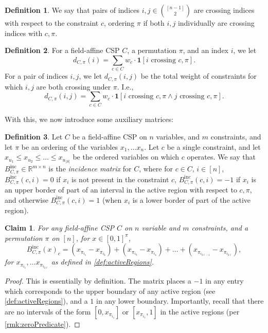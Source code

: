 \documentclass[11pt]{article}
\newtheorem{claim}[theorem]{Claim}
\theoremstyle{definition}
\newtheorem{definition}{Definition}[section]
\newcommand{\R}{\mathbb{R}}
\begin{document}
\begin{definition}
    We say that pairs of indices $i,j \in \binom{[n-1]}{2}$ are crossing indices with respect to the constraint $c$, ordering $\pi$ if both $i, j$ individually are crossing indices with $c, \pi$.
\end{definition}

\begin{definition}\label{def:NumberCrossingGeneral}
	For a field-affine CSP $C$, a permutation $\pi$, and an index $i$, we let
    \[
	 d_{C, \pi}(i) = \sum_{c \in C} w_c \cdot \mathbf{1}[i \text{ crossing } c,\pi].
	\]
    For a pair of
    indices $i, j$, we let $d_{C, \pi}(i,j)$ be the total weight of constraints for which $i,j$ are both crossing under $\pi$. I.e.,
	\[
	 d_{C, \pi}(i,j) = \sum_{c \in C} w_c \cdot \mathbf{1}[i \text{ crossing } c,\pi \wedge j \text{ crossing } c,\pi].
	\]
\end{definition}

With this, we now introduce some auxiliary matrices:

\begin{definition}\label{def:incMatrixGeneral}
	Let $C$ be a field-affine CSP on $n$ variables, and $m$ constraints, and let $\pi$ be an ordering of the variables $x_1, \dots x_n$. Let $c$ be a single constraint, and let $x_{u_1} \leq x_{u_2} \leq \dots \leq x_{u_{|S|}}$ be the ordered variables on which $c$ operates. We say that $B^{\text{inc}}_{C, \pi} \in \R^{m \times n}$ is the \emph{incidence matrix} for $C$, where for $c \in C$, $i \in [n]$, $B^{\text{inc}}_{C, \pi}(c, i) = 0$ if $x_i$ is not present in the constraint $c$, $B^{\text{inc}}_{C, \pi}(c, i) = -1$ if $x_i$ is an upper border of part of an interval in the active region with respect to $c, \pi$, and otherwise $B^{\text{inc}}_{C, \pi}(c, i) = 1$ (when $x_i$ is a lower border of part of the active region). 
\end{definition}

\begin{claim}\label{clm:incidenceGeneral}
	For any field-affine CSP $C$ on $n$ variable and $m$ constraints, and a permutation $\pi$ on $[n]$,  for $x \in [0,1]^{\pi}$, 
    \[
    B^{\text{inc}}_{C, \pi}(x)_c = (x_{\pi_{i_1}} - x_{\pi_{i_2}}) + (x_{\pi_{i_3}} - x_{\pi_{i_4}}) + \dots + (x_{\pi_{i_{2\ell -1}}} - x_{\pi_{i_{2\ell}}}),
    \]
    for $x_{\pi_{i_1}}, \dots x_{\pi_{i_{2\ell}}}$ as defined in \cref{def:activeRegions}.
\end{claim}

\begin{proof}
    This is essentially by definition. The matrix places a $-1$ in any entry which corresponds to the upper boundary of any active region (see \cref{def:activeRegions}), and a $1$ in any lower boundary. Importantly, recall that there are no intervals of the form $[0, x_{\pi_{i_1}}]$ or $[x_{\pi_{i_{\ell}}}, 1]$ in the active regions (per \cref{rmk:zeroPredicate}).
\end{proof}
\end{document}
